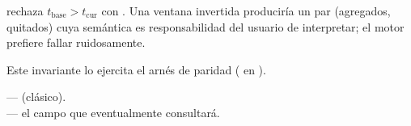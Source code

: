 \begin{invariant}
 rechaza $t_{\text{base}} > t_{\text{cur}}$ con
. Una ventana invertida produciría
un par (agregados, quitados) cuya semántica es responsabilidad
del usuario de interpretar; el motor prefiere fallar ruidosamente.
\end{invariant}

Este invariante lo ejercita el arnés de paridad
( en
).

\begin{inthecode}
 ---
 (clásico).\\
 --- el campo
 que 
eventualmente consultará.
\end{inthecode}
